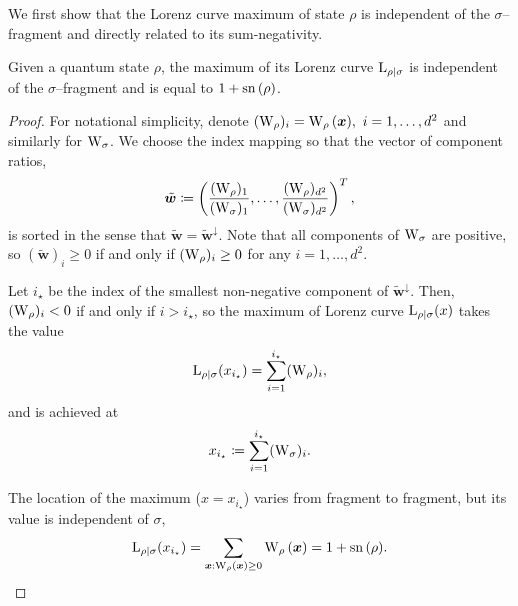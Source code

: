\documentclass[pra,
aps,
twocolumn,
superscriptaddress,
groupedaddress,
nofootinbib,
reprint
]{revtex4-1}
\begin{document}
We first show that the Lorenz curve maximum of state $\rho$ is independent of the $\sigma$--fragment and directly related to its sum-negativity.
\begin{lemma}\label{lem:lcmax}
	Given a quantum state $\rho$, the maximum of its Lorenz curve ${{\rm{L}}_{\rho|\sigma}}$ is independent of the $\sigma$--fragment and is equal to $1+{{\rm{sn}}\left(\rho\right)}$.
\end{lemma}
\begin{proof}
	For notational simplicity, denote $(\W{\rho})_i = \W[\bmx]{\rho},\ i = 1,\dots, d^2$ and similarly for $\W{\sigma}$.
	We choose the index mapping so that the vector of component ratios, 
	\begin{equation}
		\tilde{\bm{w}} \coloneqq \left(\frac{(\W{\rho})_1}{(\W{\sigma})_1}, \dots, \frac{(\W{\rho})_{d^2}}{(\W{\sigma})_{d^2}} \right)^T,
	\end{equation}
	is sorted in the sense that $\tilde{\bm{w}} = \tilde{\bm{w}}^\downarrow$.
	Note that all components of $\W{\sigma}$ are positive, so $(\tilde{\bm{w}})_i \geq 0$ if and only if $(\W{\rho})_i \geq 0$ for any $i=1,\dots,d^2$.
	
	Let $i_\star$ be the index of the smallest non-negative component of $\tilde{\bm{w}}^\downarrow$.
	Then, $(\W{\rho})_i < 0$ if and only if $i > i_\star$, so the maximum of Lorenz curve ${{\rm{L}}_{\rho|\sigma}}(x)$ takes the value 
	\begin{equation}
		\lc{\rho}{\sigma}(x_{i_\star}) = \sum_{i=1}^{i_\star} (\W{\rho})_i,
	\end{equation}
	and is achieved at
	\begin{equation}\label{eq:maxloc}
		x_{i_\star} \coloneqq \sum_{i=1}^{i_\star} (\W{\sigma})_i.
	\end{equation}

	The location of the maximum ($x=x_{i_\star}$) varies from fragment to fragment, but its value is independent of $\sigma$,
	\begin{equation}
		\lc{\rho}{\sigma}(x_{i_\star})
		= \sum\limits_{\bmx: \W[\bmx]{\rho} \geq 0} \W[\bmx]{\rho}
		= 1 + \sn{\rho}.
	\end{equation}
	
\end{proof}
\end{document}
